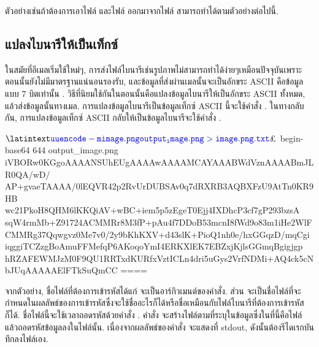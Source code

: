 \begin{thwbr}
ตัวอย่างเช่นถ้าต้องการเอาไฟล์  และไฟล์  ออกมาจากไฟล์  สามารถทำได้ตามตัวอย่างต่อไปนี้.
\begin{MyExample}
\end{MyExample}%

\subsection{แปลงไบนารีให้เป็นเท็กซ์}
ในสมัยที่อีเมลเริ่มใช้ใหม่ๆ, การส่งไฟล์ไบนารีเช่นรูปภาพไม่สามารถทำได้ง่ายๆเหมือนปัจจุบันเพราะตอนนั้นยังไม่มีมาตรฐานแน่นอนรองรับ, และข้อมูลที่ส่งผ่านเมลนั้นจะเป็นอักขระ ASCII คือข้อมูลแบบ 7 บิตเท่านั้น \cite{smtp}. วิธีที่นิยมใช้กันในตอนนั้นคือแปลงข้อมูลไบนารีให้เป็นอักขระ ASCII ทั้งหมด, แล้วส่งข้อมูลนั้นทางเมล. การแปลงข้อมูลไบนารีเป็นข้อมูลเท็กซ์ ASCII นี้จะใช้คำสั่ง . ในทางกลับกัน, การแปลงข้อมูลเท็กซ์ ASCII กลับให้เป็นข้อมูลไบนารีจะใช้คำสั่ง .

\begin{MyExample}
\begin{MyEx}
$ 
$ 
begin-base64 644 output_image.png
iVBORw0KGgoAAAANSUhEUgAAAAwAAAAMCAYAAABWdVznAAAABmJLR0QA/wD/
AP+gvaeTAAAA/0lEQVR42p2RvUrDUBSAv0q7dRXRB3AQBXFzU9AtTn0KR9HB
wc21PkoH8QHM6lKKQiAV+wBC+iem5p5zEgeT0Ejj4IXDhcP3cf7gP293bzsA
sqW4rmMb+Z91724ACMMRr8M3fP+pAu4f7DDoB53mcnI8fWd9o83m1iHe2WlF
CMMRg37Qqwgvz0Me7v0/2y9bKhKXV+d43slK+PioQ1nh0e/hxGGqzD/mqCgi
iqggiTCZzgBoAmuFFMefqP6AKoqoYmI4ERKXlEK7EBZxjKjlsGGmqBgigjgp
hRZAFEWMJzM0F9QU1RRTxdKURfxVztICLn4dri5uGys2VrfNDMi+AQ4ck5cN
bJUqAAAAAElFTkSuQmCC
====
\end{MyEx}
\end{MyExample}

จากตัวอย่าง, ชื่อไฟล์ที่ต้องการเข้ารหัสได้แก่  จะเป็นอาร์กิวเมนต์ของคำสั่ง. ส่วน  จะเป็นชื่อไฟล์ที่จะกำหนดในผลลัพธ์ของการเข้ารหัสซึ่งจะใช้ชื่ออะไรก็ได้หรือชื่อเหมือนกับไฟล์ไบนารีที่ต้องการเข้ารหัสก็ได้. ชื่อไฟล์นี้จะใช้เวลาถอดรหัสด้วยคำสั่ง . คำสั่ง  จะสร้างไฟล์ตามที่ระบุในข้อมูลซึ่งในที่นี้คือไฟล์  แล้วถอดรหัสข้อมูลลงในไฟล์นั้น. เนื่องจากผลลัพธ์ของคำสั่ง  จะแสดงที่ stdout, ดังนั้นต้องรีไดเรกบันทึกลงไฟล์เอง.


\end{thwbr}
